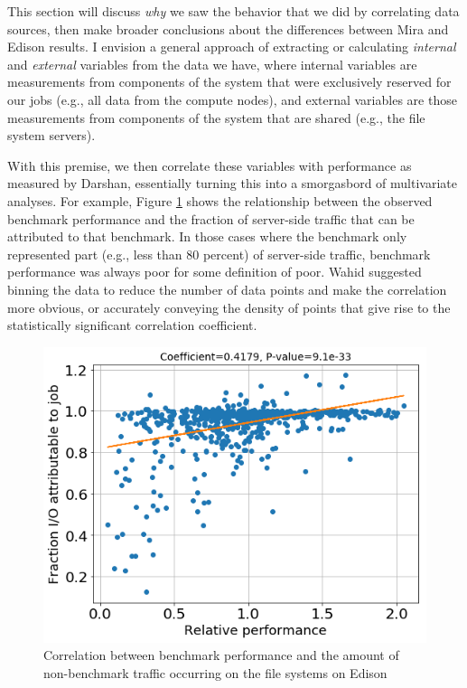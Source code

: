 \documentclass[conference,10pt,compsocconf]{IEEEtran}
\begin{document}
This section will discuss \emph{why} we saw the behavior that we did by
correlating data sources, then make broader conclusions about the differences
between Mira and Edison results.  I envision a general approach of extracting
or calculating \emph{internal} and \emph{external} variables from the data we
have, where internal variables are measurements from components of the system
that were exclusively reserved for our jobs (e.g., all data from the compute
nodes), and external variables are those measurements from components of the
system that are shared (e.g., the file system servers).

With this premise, we then correlate these variables with performance as
measured by Darshan, essentially turning this into a smorgasbord of
multivariate analyses.  For example, Figure \ref{fig:correlate-perf-and-fstraffic}
shows the relationship between the observed benchmark performance and the
fraction of server-side traffic that can be attributed to that benchmark.
In those cases where the benchmark only represented part (e.g., less than 80
percent) of server-side traffic, benchmark performance was always poor for
some definition of poor.  Wahid suggested binning the data to reduce the
number of data points and make the correlation more obvious, or accurately
conveying the density of points that give rise to the statistically significant
correlation coefficient.

\begin{figure}[t]
\centering
\includegraphics[width=0.8\columnwidth]{figs/edison-perf-vs-fstraffic.png}
\caption{Correlation between benchmark performance and the amount of
non-benchmark traffic occurring on the file systems on Edison}
\label{fig:correlate-perf-and-fstraffic}
\vspace{-.1in}
\end{figure}
\end{document}

